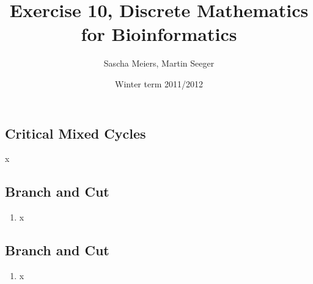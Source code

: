 \documentclass[a4paper, oneside]{scrartcl}
\author{Sascha Meiers, Martin Seeger}
\title{Exercise 10, Discrete Mathematics for Bioinformatics}
\date{Winter term 2011/2012}
\begin{document}
\maketitle


\subsection{Critical Mixed Cycles}

x

\subsection{Branch and Cut}

\renewcommand{\labelenumi}{\alph{enumi})}
\begin{enumerate}
  \item 
x
\end{enumerate}

\subsection{Branch and Cut}

\renewcommand{\labelenumi}{\alph{enumi})}
\begin{enumerate}
  \item 
x
\end{enumerate}
\end{document}
